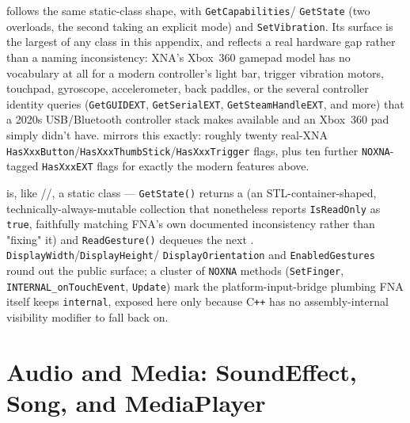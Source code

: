  follows the same static-class shape, with \texttt{GetCapabilities}/%
\texttt{GetState} (two overloads, the second taking an explicit  mode)
and \texttt{SetVibration}. Its  surface is the largest of any class in this
appendix, and reflects a real hardware gap rather than a naming inconsistency: XNA's Xbox~360
gamepad model has no vocabulary at all for a modern controller's light bar, trigger vibration
motors, touchpad, gyroscope, accelerometer, back paddles, or the several controller identity
queries (\texttt{GetGUIDEXT}, \texttt{GetSerialEXT}, \texttt{GetSteamHandleEXT}, and more) that a
2020s USB/Bluetooth controller stack makes available and an Xbox~360 pad simply didn't have.
 mirrors this exactly: roughly twenty real-XNA
\texttt{HasXxxButton}/\texttt{HasXxxThumbStick}/\texttt{HasXxxTrigger} flags, plus ten further
\texttt{NOXNA}-tagged \texttt{HasXxxEXT} flags for exactly the modern features above.

 is, like //, a
static class --- \texttt{GetState()} returns a  (an
STL-container-shaped, technically-always-mutable collection that nonetheless reports
\texttt{IsReadOnly} as \texttt{true}, faithfully matching FNA's own documented inconsistency
rather than \\ "fixing" it) and \texttt{ReadGesture()} dequeues the next
. \texttt{DisplayWidth}/\texttt{DisplayHeight}/%
\texttt{DisplayOrientation} and \texttt{EnabledGestures} round out the public surface; a cluster
of \texttt{NOXNA} methods (\texttt{SetFinger}, \texttt{INTERNAL\_onTouchEvent}, \texttt{Update})
mark the platform-input-bridge plumbing FNA itself keeps \texttt{internal}, exposed here only
because C\texttt{++} has no assembly-internal visibility modifier to fall back on.

\section{Audio and Media: SoundEffect, Song, and MediaPlayer}
\label{sec:api-audio-media}

